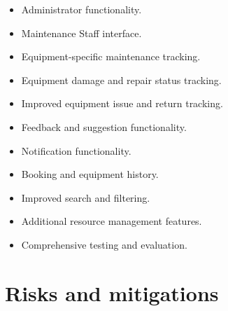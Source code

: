 \documentclass[11pt,a4paper]{article}
\begin{document}
\begin{itemize}[leftmargin=0.7cm]

    \item Administrator functionality.

    \item Maintenance Staff interface.

    \item Equipment-specific maintenance tracking.

    \item Equipment damage and repair status tracking.

    \item Improved equipment issue and return tracking.

    \item Feedback and suggestion functionality.

    \item Notification functionality.

    \item Booking and equipment history.

    \item Improved search and filtering.

    \item Additional resource management features.

    \item Comprehensive testing and evaluation.

\end{itemize}


\section{Risks and mitigations}
\end{document}

